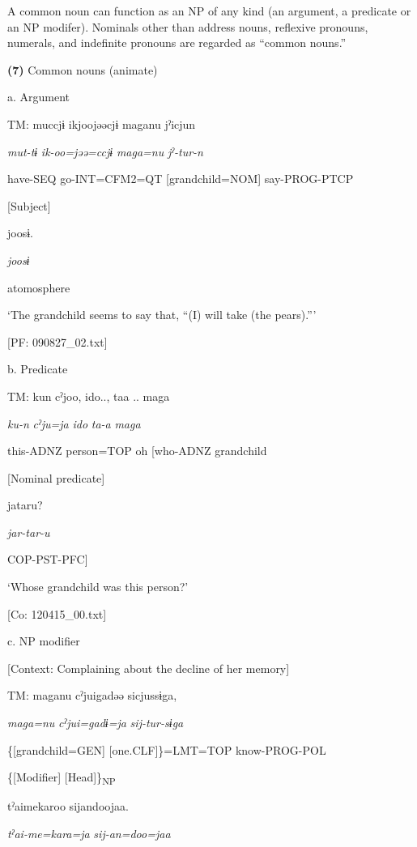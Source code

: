 A common noun can function as an NP of any kind (an argument, a predicate or an NP modifer). Nominals other than address nouns, reflexive pronouns, numerals, and indefinite pronouns are regarded as “common nouns.”

\textbf{(7)}  Common nouns (animate)

  a.  Argument

    TM:  muccjɨ  ikjoojəəcjɨ  maganu  jˀicjun

      \textit{mut-tɨ}  \textit{ik-oo=jəə=ccjɨ}  \textit{maga=nu}  \textit{jˀ-tur-n}

      have-SEQ  go-INT=CFM2=QT  [grandchild=NOM]  say-PROG-PTCP

          [Subject]  

      joosɨ.

      \textit{joosɨ}

      atomosphere

      ‘The grandchild seems to say that, “(I) will take (the pears).”’

      [PF: 090827\_02.txt]

  b.  Predicate

    TM:  kun  cˀjoo,  ido..,  taa ..  maga

      \textit{ku-n}  \textit{cˀju=ja}  \textit{ido}  \textit{ta-a}  \textit{maga}

      this-ADNZ  person=TOP  oh  [who-ADNZ  grandchild

            [Nominal predicate]

      jataru?

      \textit{jar-tar-u}

      COP-PST-PFC]

      ‘Whose grandchild was this person?’

      [Co: 120415\_00.txt]

  c.  NP modifier

    [Context: Complaining about the decline of her memory]

    TM:  maganu  cˀjuigadəə  sicjussɨga,

      \textit{maga=nu}  \textit{cˀjui=gadɨ=ja}  \textit{sij-tur-sɨga}

      \{[grandchild=GEN]  [one.CLF]\}=LMT=TOP  know-PROG-POL

      \{[Modifier]  [Head]\}\textsubscript{NP}  

      tˀaimekaroo  sijandoojaa.

      \textit{tˀai-me=kara=ja}  \textit{sij-an=doo=jaa}

